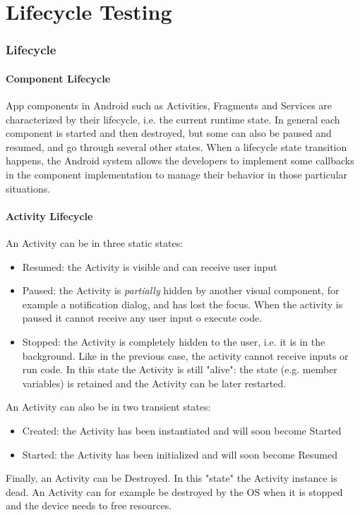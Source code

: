 \documentclass[11pt,a4paper,notitlepage]{article}
\begin{document}

\part{Lifecycle Testing}

\section{Lifecycle}

\subsection{Component Lifecycle}
App components in Android such as Activities, Fragments and Services are characterized by their lifecycle, i.e. the current runtime state. In general each component is started and then destroyed, but some can also be paused and resumed, and go through several other states. When a lifecycle state transition happens, the Android system allows the developers to implement some callbacks in the component implementation to manage their behavior in those particular situations.

\subsection{Activity Lifecycle}
An Activity can be in three static states:
\begin{itemize}
	\item Resumed: the Activity is visible and can receive user input
	\item Paused: the Activity is \textit{partially} hidden by another visual component, for example a notification dialog, and has lost the focus. When the activity is paused it cannot receive any user input o execute code.
	\item Stopped: the Activity is completely hidden to the user, i.e. it is in the background. Like in the previous case, the activity cannot receive inputs or run code. In this state the Activity is still "alive": the state (e.g. member variables) is retained and the Activity can be later restarted.
\end{itemize}
An Activity can also be in two transient states:
\begin{itemize}
	\item Created: the Activity has been instantiated and will soon become Started
	\item Started: the Activity has been initialized and will soon become Resumed
\end{itemize}
Finally, an Activity can be Destroyed. In this "state" the Activity instance is dead. An Activity can for example be destroyed by the OS when it is stopped and the device needs to free resources.\bigskip \\
\end{document}
